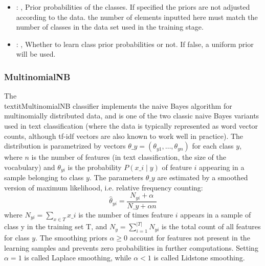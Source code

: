 \begin{itemize}
    \item {}: , 
      Prior probabilities of the classes. If specified the priors are
      not adjusted according to the data. \nb the number of elements inputted here must
      match the number of classes in the data set used in the training stage.

    \item {}: , 
      Whether to learn class prior probabilities or not. If false, a uniform
      prior will be used.
  \end{itemize}


\subsubsection{MultinomialNB}
  The \\textit{MultinomialNB} classifier implements the naive Bayes algorithm for
  multinomially distributed data, and is one of the two classic naive Bayes
  variants used in text classification (where the data is typically represented
  as word vector counts, although tf-idf vectors are also known to work well in
  practice).                         The distribution is parametrized by vectors $\theta\_y =
  (\theta_{y1},\ldots,\theta_{yn})$ for each class $y$, where $n$ is the number of
  features (in text classification, the size of the vocabulary) and $\theta_{yi}$
  is the probability $P(x\_i \mid y)$ of feature $i$ appearing in a sample
  belonging to class $y$.                         The parameters $\theta\_y$ are estimated by a
  smoothed version of maximum                         likelihood, i.e. relative frequency counting:
  \begin{equation}                         \hat{\theta}_{yi} = \frac{ N_{yi} + \alpha}{N\_y + \alpha
  n}                         \end{equation}                         where $N_{yi} = \sum_{x \in T}
  x\_i$ is the number of times feature $i$ appears                         in a sample of class y in
  the training set T, and                         $N_{y} = \sum_{i=1}^{|T|} N_{yi}$ is the total
  count of all features for class                         $y$.                         The smoothing
  priors $\alpha \ge 0$ account for features not present in the                         learning
  samples and prevents zero probabilities in further computations.                         Setting
  $\alpha = 1$ is called Laplace smoothing, while $\alpha < 1$ is called
  Lidstone smoothing.                         

